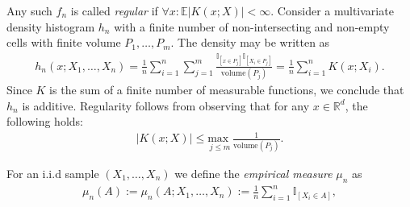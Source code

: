 \documentclass{report}
\begin{document}
Any such $f_n$ is called \textit{regular} if $\forall x : \mathbb{E}|K(x;X)| < \infty$. Consider a multivariate density histogram $h_n$ with a finite number 
of non-intersecting and non-empty cells with finite volume $P_1,\dots,P_m$. The density may be written as 
\begin{align*}
	h_n(x;X_1,\dots,X_n) = \frac{1}{n}\sum_{i=1}^{n} \sum_{j = 1}^{m} \frac{\mathbb{I}_{[x\in P_j]}\mathbb{I}_{[X_i\in P_j]}}{\text{volume}(P_j)} = \frac{1}{n}\sum_{i=1}^{n} K(x;X_i).
\end{align*}
Since $K$ is the sum of a finite number of measurable functions, we conclude that $h_n$ is additive. Regularity follows from observing that for any $x \in \mathbb{R}^d$, the following holds:
\begin{align*}
|K(x;X)| \leq \underset{j\leq m}{\text{max }} \frac{1}{\text{volume}(P_j)}.
\end{align*}

For an i.i.d sample $(X_1,\dots,X_n)$ we define the \textit{empirical measure} $\mu_n$ as 
\begin{align*}
	\mu_n(A) := \mu_n(A; X_1,\dots,X_n) := \frac{1}{n}\sum_{i = 1}^n \mathbb{I}_{[X_i \in A]},
\end{align*}
\end{document}
